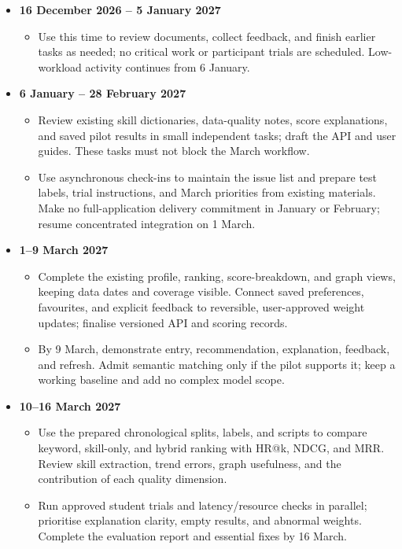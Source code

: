\documentclass[a4paper,12pt]{article}
\begin{document}
\begin{itemize}
  \item \textbf{16 December 2026 -- 5 January 2027}
    \begin{itemize}
      \item Use this time to review documents, collect feedback, and finish earlier tasks as needed; no critical work or participant trials are scheduled. Low-workload activity continues from 6 January.
    \end{itemize}

  \item \textbf{6 January -- 28 February 2027}
    \begin{itemize}
      \item Review existing skill dictionaries, data-quality notes, score explanations, and saved pilot results in small independent tasks; draft the API and user guides. These tasks must not block the March workflow.
      \item Use asynchronous check-ins to maintain the issue list and prepare test labels, trial instructions, and March priorities from existing materials. Make no full-application delivery commitment in January or February; resume concentrated integration on 1 March.
    \end{itemize}

  \item \textbf{1--9 March 2027}
    \begin{itemize}
      \item Complete the existing profile, ranking, score-breakdown, and graph views, keeping data dates and coverage visible. Connect saved preferences, favourites, and explicit feedback to reversible, user-approved weight updates; finalise versioned API and scoring records.
      \item By 9 March, demonstrate entry, recommendation, explanation, feedback, and refresh. Admit semantic matching only if the pilot supports it; keep a working baseline and add no complex model scope.
    \end{itemize}

  \item \textbf{10--16 March 2027}
    \begin{itemize}
      \item Use the prepared chronological splits, labels, and scripts to compare keyword, skill-only, and hybrid ranking with HR@k, NDCG, and MRR. Review skill extraction, trend errors, graph usefulness, and the contribution of each quality dimension.
      \item Run approved student trials and latency/resource checks in parallel; prioritise explanation clarity, empty results, and abnormal weights. Complete the evaluation report and essential fixes by 16 March.
    \end{itemize}


\end{itemize}
\end{document}
